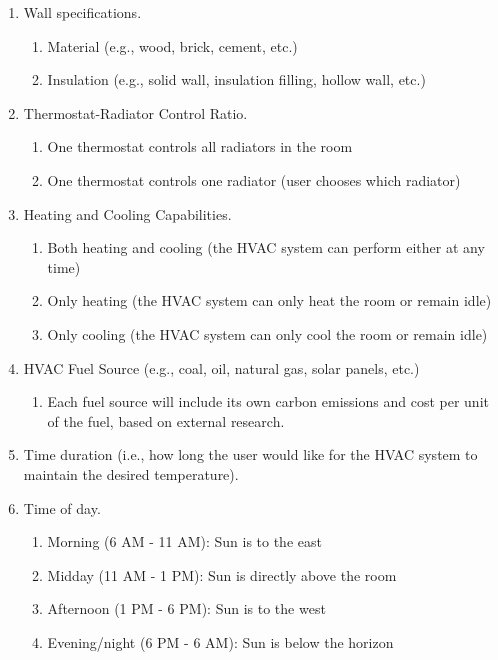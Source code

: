 \documentclass[conference,letterpaper]{IEEEtran}
\begin{document}
\begin{enumerate}
\begin{enumerate}
    \end{enumerate}
    \item Wall specifications.
    \begin{enumerate}
        \item Material (e.g., wood, brick, cement, etc.)
        \item Insulation (e.g., solid wall, insulation filling, hollow wall, etc.)
    \end{enumerate}
    \item Thermostat-Radiator Control Ratio.
    \begin{enumerate}
        \item One thermostat controls all radiators in the room
        \item One thermostat controls one radiator (user chooses which radiator)
    \end{enumerate}
    \item Heating and Cooling Capabilities.
    \begin{enumerate}
        \item Both heating and cooling (the HVAC system can perform either at any time)
        \item Only heating (the HVAC system can only heat the room or remain idle)
        \item Only cooling (the HVAC system can only cool the room or remain idle)
    \end{enumerate}
    \item HVAC Fuel Source (e.g., coal, oil, natural gas, solar panels, etc.)
    \begin{enumerate}
        \item Each fuel source will include its own carbon emissions and cost per unit of the fuel, based on external research.
    \end{enumerate}
    \item Time duration (i.e., how long the user would like for the HVAC system to maintain the desired temperature).
    \item Time of day.
    \begin{enumerate}
        \item Morning (6 AM - 11 AM): Sun is to the east
        \item Midday (11 AM - 1 PM): Sun is directly above the room
        \item Afternoon (1 PM - 6 PM): Sun is to the west
        \item Evening/night (6 PM - 6 AM): Sun is below the horizon
    \end{enumerate}
\end{enumerate}
\end{document}
